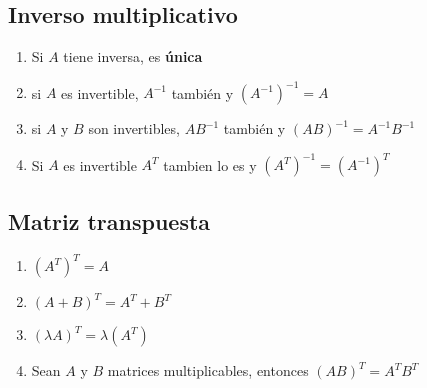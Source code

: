 \documentclass[]{article}
\begin{document}
\subsection{Inverso multiplicativo}
\begin{enumerate}
	\item Si $A$ tiene inversa, es \textbf{única}
	\item si $A$ es invertible, $A^{-1}$ también y $(A^{-1})^{-1}=A$
	\item si $A$ y $B$ son invertibles, $AB^{-1}$ también y $(AB)^{-1}=A^{-1}B^{-1}$
	\item Si $A$ es invertible $A^{T}$ tambien lo es y $(A^{T})^{-1}=(A^{-1})^{T}$
\end{enumerate}

\subsection{Matriz transpuesta}
\begin{enumerate}
	\item $(A^{T})^{T}=A$
	\item $(A+B)^{T}=A^{T}+B^{T}$
	\item $(\lambda A)^{T}= \lambda (A^{T})$
	\item Sean $A$ y $B$ matrices multiplicables, entonces $(AB)^{T}=A^{T}B^{T}$
\end{enumerate}
\end{document}

